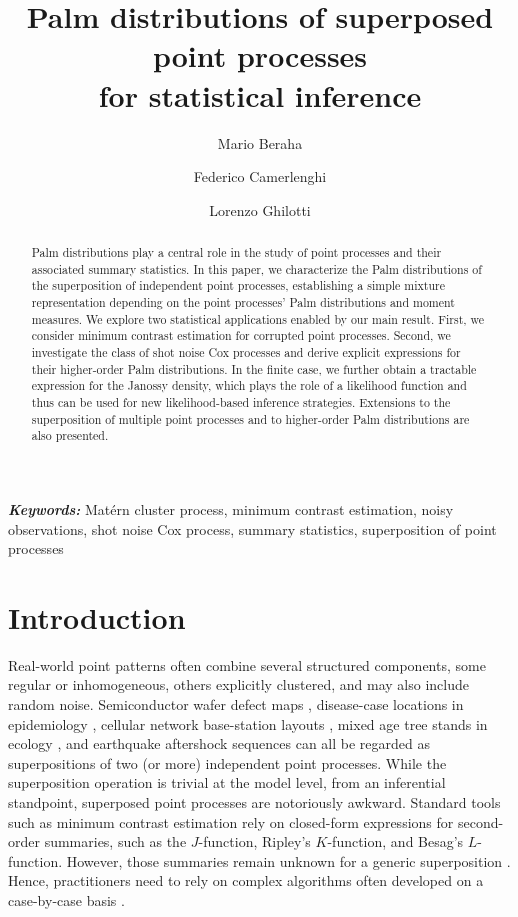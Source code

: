 \documentclass[11pt,a4paper,oneside]{article}
\date{}
\title{Palm distributions of superposed point processes \\for statistical inference}
\author[1]{Mario Beraha}
\author[1]{Federico Camerlenghi}
\author[2]{Lorenzo Ghilotti}
\affil[1]{Department of Economics, Management and Statistics, University of Milano-Bicocca, Milan, Italy}
\affil[2]{Department of Statistical Science, Duke University, Durham, NC, USA}
\providecommand{\keywords}[1]{
  \small 
  \textbf{\textit{Keywords:}} #1
  \normalsize
}
\theoremstyle{definition}
\theoremstyle{remark}
\begin{document}
\maketitle

\begin{abstract}
Palm distributions play a central role in the study of point processes and their associated summary statistics. In this paper, we characterize the Palm distributions of the superposition of independent point processes, establishing a simple mixture representation depending on the point processes' Palm distributions and moment measures.
We explore two statistical applications enabled by our main result. First, we consider minimum contrast estimation for corrupted point processes. Second, we investigate the class of shot noise Cox processes and derive explicit expressions for their higher-order Palm distributions. In the finite case, we further obtain a tractable expression for the Janossy density, which plays the role of a likelihood function and thus can be used for new likelihood-based inference strategies.
Extensions to the superposition of multiple point processes and to higher-order Palm distributions are also presented.
\end{abstract}

\keywords{Mat\'ern cluster process, minimum contrast estimation, noisy observations, shot noise Cox process, summary statistics, superposition of point processes}




\section{Introduction} \label{sec1}

Real-world point patterns often combine several structured components, some regular or inhomogeneous, others explicitly clustered, and may also include random noise. 
Semiconductor wafer defect maps \citep{Borgons2021}, disease-case locations in epidemiology \citep{meyer2017surveillance},  cellular network base-station layouts \citep{choi2017gridppp}, mixed age tree stands in ecology \citep{ngobieng2011forest}, and earthquake aftershock sequences \citep{ogata1998space} can all be regarded as superpositions of two (or more) independent point processes.
While the superposition operation is trivial at the model level, from an inferential standpoint, superposed point processes are notoriously awkward. 
Standard tools such as minimum contrast estimation rely on closed-form expressions for second-order summaries, such as the $J$-function, Ripley's $K$-function, and Besag's $L$-function. However, those summaries remain unknown for a generic superposition \citep{MoWaBook03,diggle2013statistical}. 
Hence, practitioners need to rely on complex algorithms often developed on a case-by-case basis \citep[e.g.,][]{tanaka2014superposed,xu2018hawkes}.
\end{document}
